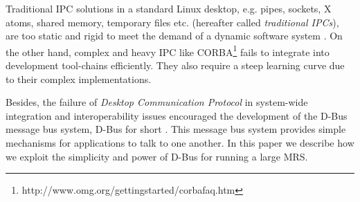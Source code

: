 Traditional IPC solutions in a standard Linux desktop, e.g. pipes, sockets, X atoms, shared memory, temporary files etc. (hereafter called {\em traditional IPCs}), are too static and rigid to meet the demand of a dynamic software system \cite{wittenburg2005}. On the other hand, complex and heavy IPC like CORBA\footnote{http://www.omg.org/gettingstarted/corbafaq.htm} fails to integrate into development tool-chains efficiently. They also require a steep learning curve due to their complex implementations. 

Besides, the failure of \textit{Desktop Communication Protocol} in system-wide integration and interoperability issues encouraged the development of the D-Bus message bus system, D-Bus for short \cite{Pennington+2010}. This message bus system provides simple mechanisms for applications to talk to one another. In this paper we describe how we exploit the simplicity and power of D-Bus for running a large MRS.

